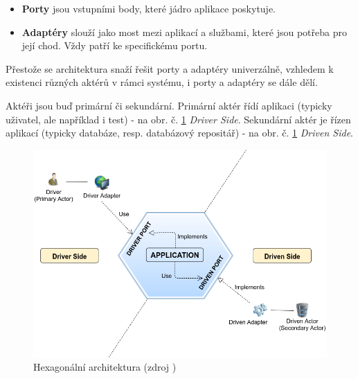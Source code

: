 \begin{itemize}
    \item \textbf{Porty} jsou vstupními body, které jádro aplikace poskytuje.\cite{bergen}
    \item \textbf{Adaptéry} slouží jako most mezi aplikací a službami, které jsou potřeba pro její chod. Vždy patří ke specifickému portu. \cite{bergen}
\end{itemize}
Přestože se architektura snaží řešit porty a adaptéry univerzálně, vzhledem k existenci různých aktérů v rámci systému, i porty a adaptéry se dále dělí. \cite{cockburn} \par
Aktéři jsou buď primární či sekundární. Primární aktér řídí aplikaci (typicky uživatel, ale například i test) - na obr. č. \ref{fig:hexagonal} \textit{Driver Side}. Sekundární aktér je řízen aplikací (typicky databáze, resp. databázový repositář) - na obr. č. \ref{fig:hexagonal} \textit{Driven Side}. \cite{cockburn} \cite{hexagonal-this}\par
\begin{figure}[H]
	\includegraphics[width=\linewidth]{img/hexagonal-scheme.png}
	\caption{Hexagonální architektura (zdroj \cite{hexagonal-this})}
	\label{fig:hexagonal}
\end{figure}
\newpage
